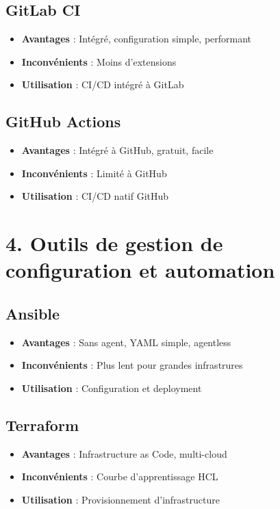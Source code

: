 \documentclass[12pt,a4paper]{report}
\begin{document}
\subsection{GitLab CI}

\begin{itemize}
    \item \textbf{Avantages} : Intégré, configuration simple, performant
    \item \textbf{Inconvénients} : Moins d'extensions
    \item \textbf{Utilisation} : CI/CD intégré à GitLab
\end{itemize}

\subsection{GitHub Actions}

\begin{itemize}
    \item \textbf{Avantages} : Intégré à GitHub, gratuit, facile
    \item \textbf{Inconvénients} : Limité à GitHub
    \item \textbf{Utilisation} : CI/CD natif GitHub
\end{itemize}

\section{4. Outils de gestion de configuration et automation}

\subsection{Ansible}

\begin{itemize}
    \item \textbf{Avantages} : Sans agent, YAML simple, agentless
    \item \textbf{Inconvénients} : Plus lent pour grandes infrastrures
    \item \textbf{Utilisation} : Configuration et deployment
\end{itemize}

\subsection{Terraform}

\begin{itemize}
    \item \textbf{Avantages} : Infrastructure as Code, multi-cloud
    \item \textbf{Inconvénients} : Courbe d'apprentissage HCL
    \item \textbf{Utilisation} : Provisionnement d'infrastructure
\end{itemize}
\end{document}
